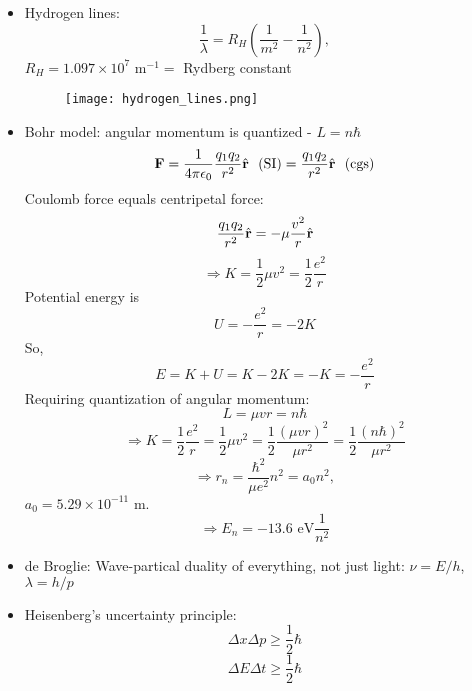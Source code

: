 \documentclass[12pt]{article}
\begin{document}
\begin{itemize}
\item Hydrogen lines:
\begin{equation}
\frac{1}{\lambda} = R_H\left(\frac{1}{m^2} - \frac{1}{n^2}\right),
\end{equation}	
$R_H = 1.097\times 10^7 \text{ m}^{-1} =$ Rydberg constant
\begin{figure}[h!]
\centering
\texttt{[image: hydrogen\_lines.png]}
\end{figure}
\item Bohr model: angular momentum is quantized - $L = n\hbar$
\begin{equation}
{\bf F} = \frac{1}{4\pi\epsilon_0}\frac{q_1q_2}{r^2}\hat{\bf r}~~(\text{SI}) = \frac{q_1q_2}{r^2}\hat{\bf r}~~(\text{cgs})
\end{equation}
Coulomb force equals centripetal force:
\begin{equation}
\frac{q_1q_2}{r^2}\hat{\bf r} = -\mu \frac{v^2}{r}\hat{\bf r}
\end{equation}
\begin{equation}
\Longrightarrow K = \frac{1}{2}\mu v^2 = \frac{1}{2}\frac{e^2}{r}
\end{equation}
Potential energy is
\begin{equation}
U = -\frac{e^2}{r} = -2K
\end{equation}
So, 
\begin{equation}
E = K+U = K - 2K = -K = -\frac{e^2}{r}
\end{equation}
Requiring quantization of angular momentum:
\begin{equation}
L = \mu v r = n \hbar
\end{equation}
\begin{equation}
\Longrightarrow K = \frac{1}{2}\frac{e^2}{r} = \frac{1}{2}\mu v^2 = \frac{1}{2}\frac{(\mu v r)^2}{\mu r^2} = \frac{1}{2}\frac{(n\hbar)^2}{\mu r^2}
\end{equation}
\begin{equation}
\Longrightarrow r_n = \frac{\hbar^2}{\mu e^2}n^2 = a_0 n^2,
\end{equation}
$a_0 = 5.29\times 10^{-11}\text{ m}$.
\begin{equation}
\Longrightarrow E_n = -13.6\text{ eV}\frac{1}{n^2}
\end{equation}
\item de Broglie: Wave-partical duality of everything, not just light: $\nu = E/h$, $\lambda = h/p$

\item Heisenberg's uncertainty principle:
\begin{equation}
\Delta x \Delta p \ge \frac{1}{2}\hbar
\end{equation}
\begin{equation}
\Delta E \Delta t \ge \frac{1}{2} \hbar
\end{equation}


\end{itemize}
\end{document}
